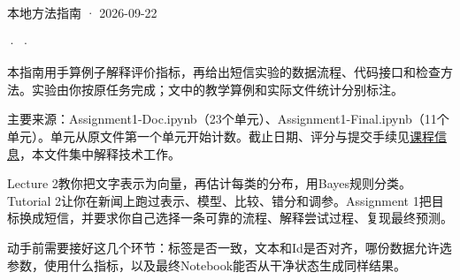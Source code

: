 





本地方法指南 · 2026-09-22


 ·  · 


本指南用手算例子解释评价指标，再给出短信实验的数据流程、代码接口和检查方法。实验由你按原任务完成；文中的教学算例和实际文件统计分别标注。


主要来源：Assignment1-Doc.ipynb（23个单元）、Assignment1-Final.ipynb（11个单元）。单元从原文件第一个单元开始计数。截止日期、评分与提交手续见\href{https://crazyshout.github.io/micro-course/notices.html?course=CS5489}{课程信息}，本文件集中解释技术工作。





Lecture 2教你把文字表示为向量，再估计每类的分布，用Bayes规则分类。Tutorial 2让你在新闻上跑过表示、模型、比较、错分和调参。Assignment 1把目标换成短信，并要求你自己选择一条可靠的流程、解释尝试过程、复现最终预测。


动手前需要接好这几个环节：标签是否一致，文本和Id是否对齐，哪份数据允许选参数，使用什么指标，以及最终Notebook能否从干净状态生成同样结果。


